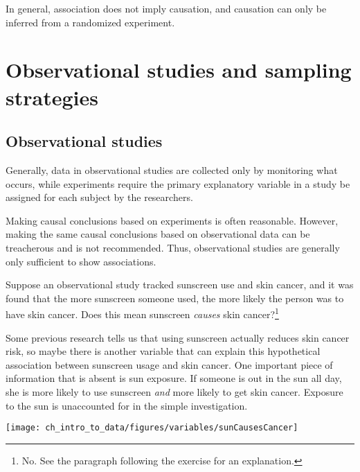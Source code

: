 \begin{tipBox}{
In general, association does not imply causation, and causation can only be inferred from a randomized experiment.}
\end{tipBox}


\section[Observational studies and sampling strategies]{Observational studies and sampling strategies }

\subsection{Observational studies}

Generally, data in observational studies are collected only by monitoring what occurs, while experiments require the primary explanatory variable in a study be assigned for each subject by the researchers.

Making causal conclusions based on experiments is often reasonable. However, making the same causal conclusions based on observational data can be treacherous and is not recommended. Thus, observational studies are generally only sufficient to show associations.

\begin{exercise} \label{sunscreenLurkingExample}
Suppose an observational study tracked sunscreen use and skin cancer, and it was found that the more sunscreen someone used, the more likely the person was to have skin cancer. Does this mean sunscreen \emph{causes} skin cancer?\footnote{No. See the paragraph following the exercise for an explanation.}
\end{exercise}

Some previous research tells us that using sunscreen actually reduces skin cancer risk, so maybe there is another variable that can explain this hypothetical association between sunscreen usage and skin cancer. One important piece of information that is absent is sun exposure. If someone is out in the sun all day, she is more likely to use sunscreen \emph{and} more likely to get skin cancer. Exposure to the sun is unaccounted for in the simple investigation.
\begin{center}
\texttt{[image: ch\_intro\_to\_data/figures/variables/sunCausesCancer]}
\end{center}

